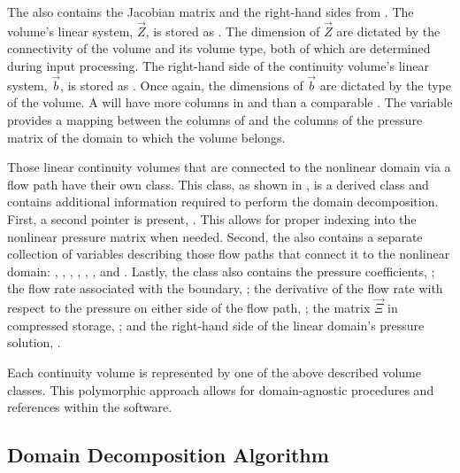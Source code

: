 The  also contains the Jacobian matrix and the right-hand sides from .
The volume's linear system, $\vec{Z}$, is stored as .
The dimension of $\vec{Z}$ are dictated by the connectivity of the volume and its volume type, both of which are determined during input processing.
The right-hand side of the continuity volume's linear system, $\vec{b}$, is stored as .
Once again, the dimensions of $\vec{b}$ are dictated by the type of the volume.
A  will have more columns in  and  than a comparable .  
The variable  provides a mapping between the columns of  and the columns of the pressure matrix of the domain to which the volume belongs.

Those linear continuity volumes that are connected to the nonlinear domain via a flow path have their own  class.
This class, as shown in , is a derived class and contains additional information required to perform the domain decomposition.
First, a second  pointer is present, .
This allows for proper indexing into the nonlinear pressure matrix when needed.
Second, the  also contains a separate collection of variables describing those flow paths that connect it to the nonlinear domain: , , , , , , and .
Lastly, the  class also contains the pressure coefficients, ; the flow rate associated with the boundary, ; the derivative of the flow rate with respect to the pressure on either side of the flow path, ; the matrix $\vec{\Xi}$ in compressed storage, ; and the right-hand side of the linear domain's pressure solution, .

Each continuity volume is represented by one of the above described volume classes.
This polymorphic approach allows for domain-agnostic procedures and references within the software.

\subsection{Domain Decomposition Algorithm}
\label{subsect:domDecompAlgorithm}

